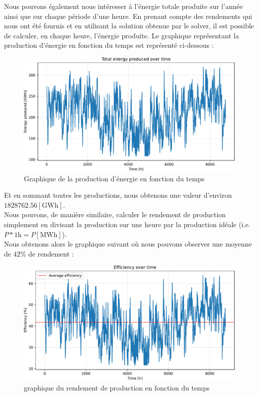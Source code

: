 \documentclass{article}
\newlength{\temp}
\begin{document}
Nous pouvons également nous intéresser à l'énergie totale produite sur l'année ainsi que sur chaque période d'une heure.
En prenant compte des rendements qui nous ont été fournis et en utilisant la solution obtenue par le solver,
il est possible de calculer, en chaque heure, l'énergie produite. Le graphique représentant la production d'énergie en fonction du temps est représenté ci-dessous :

\begin{figure}[h!]
    \centering
    \includegraphics[scale=0.5]{Images/Partie_1/Q1/energy_produced.pdf}
    \caption{Graphique de la production d'énergie en fonction du temps}
    \label{fig:energy_produced_partie1}
\end{figure}
Et en sommant toutes les productions, nous obtenons une valeur d'environ $1828762.56 [\mathrm{GWh}]$.\\
Nous pouvons, de manière similaire, calculer le rendement de production simplement en divisant la production sur une heure par la production idéale (i.e. $P*1\mathrm{h} = P [\mathrm{MWh}]$).\\
Nous obtenons alors le graphique suivant où nous pouvons observer une moyenne de $42\%$ de rendement :

\begin{figure}[h!]
    \centering
    \includegraphics[scale=0.5]{Images/Partie_1/Q1/efficiency.pdf}
    \caption{graphique du rendement de production en fonction du temps}
    \label{fig:efficiency_partie1}
\end{figure}
\end{document}
